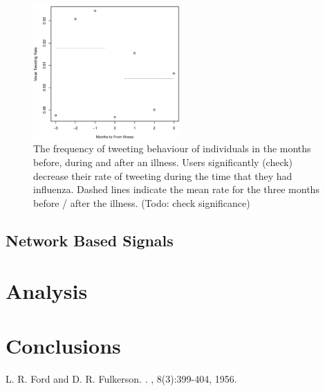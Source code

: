 \documentclass{acm_proc_article-sp}
\begin{document}
\begin{figure}
\centering
\includegraphics[width=0.5\textwidth]{figs/meanFrequencies.eps}
\caption{The frequency of tweeting behaviour of individuals in the months before, during and after an illness. Users significantly (check) decrease their rate of tweeting during the time that they had influenza. Dashed lines indicate the mean rate for the three months before / after the illness. (Todo: check significance)}
\label{fig:mean_freq}
\end{figure}


\subsection{Network Based Signals}

\section{Analysis}

\section{Conclusions}

\begin{thebibliography}{1}
L. R. Ford and D. R. Fulkerson. . , 8(3):399-404, 1956.
\end{thebibliography}





%

%
%

\balancecolumns
\end{document}
